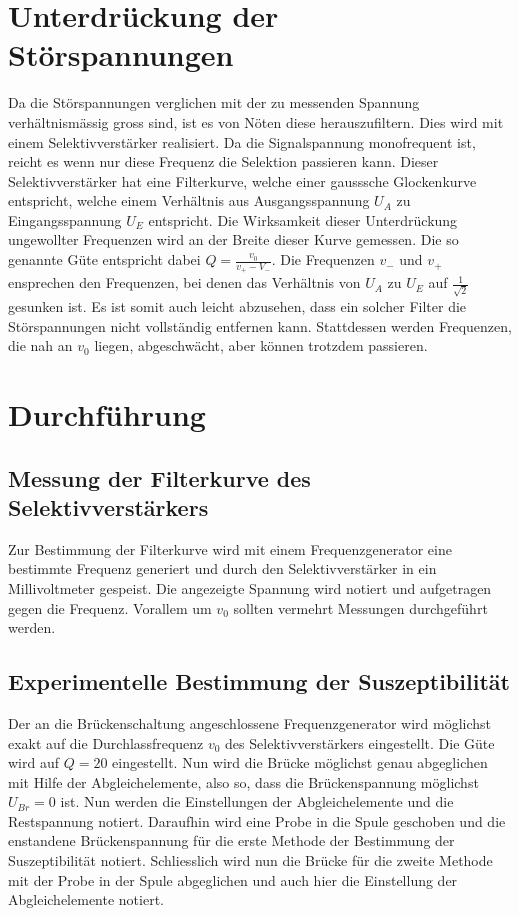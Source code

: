 \section{Unterdrückung der Störspannungen}
Da die Störspannungen verglichen mit der zu messenden Spannung verhältnismässig gross sind, ist es von Nöten diese herauszufiltern. Dies wird mit einem Selektivverstärker realisiert. Da die Signalspannung monofrequent ist, reicht es wenn nur diese Frequenz die Selektion passieren kann. Dieser Selektivverstärker hat eine Filterkurve, welche einer gausssche Glockenkurve entspricht, welche einem Verhältnis aus Ausgangsspannung $U_A$ zu Eingangsspannung $U_E$ entspricht. Die Wirksamkeit dieser Unterdrückung ungewollter Frequenzen wird an der Breite dieser Kurve gemessen. Die so genannte Güte entspricht dabei $Q=\frac{v_0}{v_+-V_-}$. Die Frequenzen $v_-$ und $v_+$ ensprechen den Frequenzen, bei denen das Verhältnis von $U_A$ zu $U_E$ auf $\frac{1}{\sqrt{2}}$ gesunken ist. Es ist somit auch leicht abzusehen, dass ein solcher Filter die Störspannungen nicht vollständig entfernen kann. Stattdessen werden Frequenzen, die nah an $v_0$ liegen, abgeschwächt, aber können trotzdem passieren.
\section{Durchführung}
\subsection{Messung der Filterkurve des Selektivverstärkers}
Zur Bestimmung der Filterkurve wird mit einem Frequenzgenerator eine bestimmte Frequenz generiert und durch den Selektivverstärker in ein Millivoltmeter gespeist. Die angezeigte Spannung wird notiert und aufgetragen gegen die Frequenz. Vorallem um $v_0$ sollten vermehrt Messungen durchgeführt werden.
\subsection{Experimentelle Bestimmung der Suszeptibilität}
Der an die Brückenschaltung angeschlossene Frequenzgenerator wird möglichst exakt auf die Durchlassfrequenz $v_0$ des Selektivverstärkers eingestellt. Die Güte wird auf $Q=20$ eingestellt. Nun wird die Brücke möglichst genau abgeglichen mit Hilfe der Abgleichelemente, also so, dass die Brückenspannung möglichst $U_{Br}=0$ ist. Nun werden die Einstellungen der Abgleichelemente und die Restspannung notiert. Daraufhin wird eine Probe in die Spule geschoben und die enstandene Brückenspannung für die erste Methode der Bestimmung der Suszeptibilität notiert. Schliesslich wird nun die Brücke für die zweite Methode mit der Probe in der Spule abgeglichen und auch hier die Einstellung der Abgleichelemente notiert.
